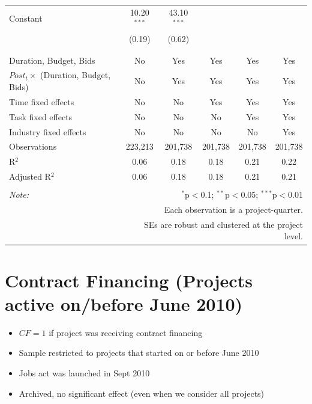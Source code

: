\documentclass[
]{article}
\providecommand{\tightlist}{%
  \setlength{\itemsep}{0pt}\setlength{\parskip}{0pt}}
\begin{document}
\begin{table}[H]
\begin{tabular}{@{\extracolsep{-2pt}}lccccc}
 Constant & 10.20$^{***}$ & 43.10$^{***}$ &  &  &  \\ 
  & (0.19) & (0.62) &  &  &  \\ 
  & & & & & \\ 
\hline \\[-1.8ex] 
Duration, Budget, Bids & No & Yes & Yes & Yes & Yes \\ 
$Post_t \times $  (Duration, Budget, Bids) & No & Yes & Yes & Yes & Yes \\ 
Time fixed effects & No & No & Yes & Yes & Yes \\ 
Task fixed effects & No & No & No & Yes & Yes \\ 
Industry fixed effects & No & No & No & No & Yes \\ 
Observations & 223,213 & 201,738 & 201,738 & 201,738 & 201,738 \\ 
R$^{2}$ & 0.06 & 0.18 & 0.18 & 0.21 & 0.22 \\ 
Adjusted R$^{2}$ & 0.06 & 0.18 & 0.18 & 0.21 & 0.21 \\ 
\hline 
\hline \\[-1.8ex] 
\textit{Note:}  & \multicolumn{5}{r}{$^{*}$p$<$0.1; $^{**}$p$<$0.05; $^{***}$p$<$0.01} \\ 
 & \multicolumn{5}{r}{Each observation is a project-quarter.} \\ 
 & \multicolumn{5}{r}{SEs are robust and clustered at the project level.} \\ 
\end{tabular} 
\end{table}

\hypertarget{contract-financing-projects-active-onbefore-june-2010}{%
\section{Contract Financing (Projects active on/before June
2010)}\label{contract-financing-projects-active-onbefore-june-2010}}

\begin{itemize}
\tightlist
\item
  \(CF=1\) if project was receiving contract financing
\item
  Sample restricted to projects that started on or before June 2010
\item
  Jobs act was launched in Sept 2010
\item
  Archived, no significant effect (even when we consider all projects)
\end{itemize}
\end{document}
